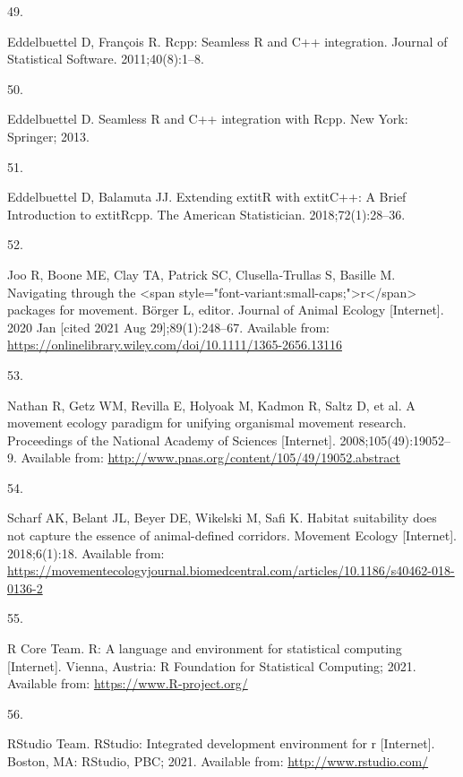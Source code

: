 \documentclass[10pt,a4paper]{article}
\newlength{\cslhangindent}
\newlength{\csllabelwidth}
\newlength{\cslentryspacingunit} %
\newenvironment{CSLReferences}[2] %
 {%
  \setlength{\parindent}{0pt}
  \ifodd #1
  \let\oldpar\par
  \def\par{\hangindent=\cslhangindent\oldpar}
  \fi
  \setlength{\parskip}{#2\cslentryspacingunit}
 }%
 {}
\newcommand{\CSLLeftMargin}[1]{\parbox[t]{\csllabelwidth}{#1}}
\newcommand{\CSLRightInline}[1]{\parbox[t]{\linewidth - \csllabelwidth}{#1}\break}
\begin{document}
\begin{CSLReferences}{0}{0}
\leavevmode\hypertarget{ref-Eddelbuettel_seamless_2011}{}%
\CSLLeftMargin{49. }
\CSLRightInline{Eddelbuettel D, François R. {Rcpp}: Seamless {R} and {C++} integration. Journal of Statistical Software. 2011;40(8):1--8. }

\leavevmode\hypertarget{ref-Eddelbuettel_seamless_2013}{}%
\CSLLeftMargin{50. }
\CSLRightInline{Eddelbuettel D. Seamless {R} and {C++} integration with {Rcpp}. New York: Springer; 2013. }

\leavevmode\hypertarget{ref-Eddelbuettel_extending_2018}{}%
\CSLLeftMargin{51. }
\CSLRightInline{Eddelbuettel D, Balamuta JJ. {Extending extit{R} with extit{C++}: A Brief Introduction to extit{Rcpp}}. The American Statistician. 2018;72(1):28--36. }

\leavevmode\hypertarget{ref-joo_navigating_2020}{}%
\CSLLeftMargin{52. }
\CSLRightInline{Joo R, Boone ME, Clay TA, Patrick SC, Clusella‐Trullas S, Basille M. Navigating through the {\textless{}}span style="font-variant:small-caps;"{\textgreater{}}r{\textless{}}/span{\textgreater{}} packages for movement. Börger L, editor. Journal of Animal Ecology {[}Internet{]}. 2020 Jan {[}cited 2021 Aug 29{]};89(1):248--67. Available from: \url{https://onlinelibrary.wiley.com/doi/10.1111/1365-2656.13116}}

\leavevmode\hypertarget{ref-Nathan2008}{}%
\CSLLeftMargin{53. }
\CSLRightInline{Nathan R, Getz WM, Revilla E, Holyoak M, Kadmon R, Saltz D, et al. A movement ecology paradigm for unifying organismal movement research. Proceedings of the National Academy of Sciences {[}Internet{]}. 2008;105(49):19052--9. Available from: \url{http://www.pnas.org/content/105/49/19052.abstract}}

\leavevmode\hypertarget{ref-Scharf2018}{}%
\CSLLeftMargin{54. }
\CSLRightInline{Scharf AK, Belant JL, Beyer DE, Wikelski M, Safi K. Habitat suitability does not capture the essence of animal-defined corridors. Movement Ecology {[}Internet{]}. 2018;6(1):18. Available from: \url{https://movementecologyjournal.biomedcentral.com/articles/10.1186/s40462-018-0136-2}}

\leavevmode\hypertarget{ref-R-base}{}%
\CSLLeftMargin{55. }
\CSLRightInline{R Core Team. R: A language and environment for statistical computing {[}Internet{]}. Vienna, Austria: R Foundation for Statistical Computing; 2021. Available from: \url{https://www.R-project.org/}}

\leavevmode\hypertarget{ref-RStudioTeam2021}{}%
\CSLLeftMargin{56. }
\CSLRightInline{RStudio Team. RStudio: Integrated development environment for r {[}Internet{]}. Boston, MA: RStudio, PBC; 2021. Available from: \url{http://www.rstudio.com/}}


\end{CSLReferences}
\end{document}
